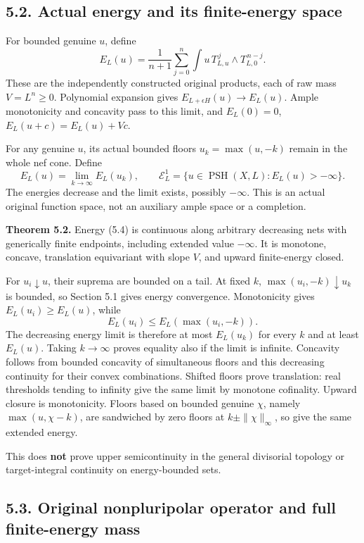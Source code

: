 \documentclass[
  10pt,
]{article}
\begin{document}
\subsection{5.2. Actual energy and its finite-energy
space}\label{actual-energy-and-its-finite-energy-space}

For bounded genuine \(u\), define \[E_L(u)=\frac1{n+1}\sum_{j=0}^n
\int u\,T_{L,u}^{\,j}\wedge T_{L,0}^{\,n-j}. \tag{5.3}\] These are the
independently constructed original products, each of raw mass
\(V=L^n\ge0\). Polynomial expansion gives
\(E_{L+\epsilon H}(u)\to E_L(u)\). Ample monotonicity and concavity pass
to this limit, and \(E_L(0)=0\), \(E_L(u+c)=E_L(u)+Vc\).

For any genuine \(u\), its actual bounded floors \(u_k=\max(u,-k)\)
remain in the whole nef cone. Define
\[E_L(u)=\lim_{k\to\infty}E_L(u_k),\qquad
\mathcal E^1_L=\{u\in\operatorname{PSH}(X,L):E_L(u)>-\infty\}. \tag{5.4}\]
The energies decrease and the limit exists, possibly \(-\infty\). This
is an actual original function space, not an auxiliary ample space or a
completion.

\textbf{Theorem 5.2.} Energy (5.4) is continuous along arbitrary
decreasing nets with generically finite endpoints, including extended
value \(-\infty\). It is monotone, concave, translation equivariant with
slope \(V\), and upward finite-energy closed.

For \(u_i\downarrow u\), their suprema are bounded on a tail. At fixed
\(k\), \(\max(u_i,-k)\downarrow u_k\) is bounded, so Section 5.1 gives
energy convergence. Monotonicity gives \(E_L(u_i)\ge E_L(u)\), while
\[E_L(u_i)\le E_L(\max(u_i,-k)).\] The decreasing energy limit is
therefore at most \(E_L(u_k)\) for every \(k\) and at least \(E_L(u)\).
Taking \(k\to\infty\) proves equality also if the limit is infinite.
Concavity follows from bounded concavity of simultaneous floors and this
decreasing continuity for their convex combinations. Shifted floors
prove translation: real thresholds tending to infinity give the same
limit by monotone cofinality. Upward closure is monotonicity. Floors
based on bounded genuine \(\chi\), namely \(\max(u,\chi-k)\), are
sandwiched by zero floors at \(k\pm\|\chi\|_\infty\), so give the same
extended energy.

This does \textbf{not} prove upper semicontinuity in the general
divisorial topology or target-integral continuity on energy-bounded
sets.

\subsection{5.3. Original nonpluripolar operator and full finite-energy
mass}\label{original-nonpluripolar-operator-and-full-finite-energy-mass}
\end{document}
